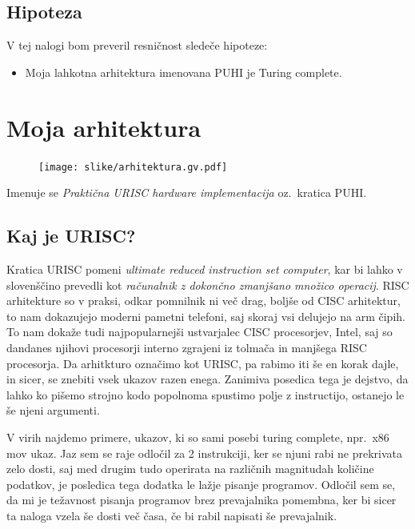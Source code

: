 \documentclass[12pt]{article}
\begin{document}
\subsection{Hipoteza}
V tej nalogi bom preveril resničnost sledeče hipoteze:
\begin{itemize}
  \item Moja lahkotna arhitektura imenovana PUHI je Turing complete.
\end{itemize}

\section{Moja arhitektura}
\begin{figure}[h]
  \centering
  \texttt{[image: slike/arhitektura.gv.pdf]}
\end{figure}
Imenuje se \textit{Praktična URISC hardware implementacija} oz.\ kratica PUHI.\@
\subsection{Kaj je URISC?}
Kratica URISC pomeni \textit{ultimate reduced instruction set computer}, kar bi lahko v slovenščino prevedli kot \textit{računalnik z dokončno zmanjšano množico operacij}.
RISC arhitekture so v praksi, odkar pomnilnik ni več drag, boljše od CISC arhitektur, to nam dokazujejo moderni pametni telefoni, saj skoraj vsi delujejo na arm čipih.
To nam dokaže tudi najpopularnejši ustvarjalec CISC procesorjev, Intel, saj so dandanes njihovi procesorji interno zgrajeni iz tolmača in manjšega RISC procesorja.
Da arhitkturo označimo kot URISC, pa rabimo iti še en korak dajle, in sicer, se znebiti vsek ukazov razen enega.
Zanimiva posedica tega je dejstvo, da lahko ko pišemo strojno kodo popolnoma spustimo polje z instructijo, ostanejo le še njeni argumenti.

V virih najdemo primere, ukazov, ki so sami posebi turing complete, npr.\ x86 mov ukaz.
Jaz sem se raje odločil za 2 instrukciji, ker se njuni rabi ne prekrivata zelo dosti, saj med drugim tudo operirata na različnih magnitudah količine podatkov, je posledica tega dodatka le lažje pisanje programov.
Odločil sem se, da mi je težavnost pisanja programov brez prevajalnika pomembna, ker bi sicer ta naloga vzela še dosti več časa, če bi rabil napisati še prevajalnik.
\end{document}
